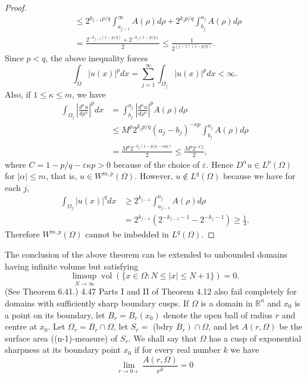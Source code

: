 \begin{proof}
\[\begin{aligned}
  & \leq 2^{k_{j-1} p / q} \int_{a_{j-1}}^{\infty} A(\rho) d \rho+2^{k_j p / q} \int_{b_j}^{a_j} A(\rho) d \rho \\
  & =\frac{2^{-k_{j-1}(1-p / q)}+2^{-k_j(1-p / q)}}{2} \leq \frac{1}{2^{(j-1)(1-p / q)}} .
  \end{aligned}
  \]
  Since $p<q$, the above inequality forces
  \[
  \int_{\Omega}|u(x)|^p d x=\sum_{j=1}^{\infty} \int_{\Omega_j}|u(x)|^p d x<\infty .
  \]
  Also, if $1 \leq \kappa \leq m$, we have
  \[
  \begin{aligned}
  \int_{\Omega_j}\left|\frac{d^\kappa u}{d \rho^\kappa}\right|^p d x & =\int_{b_j}^{a_j}\left|\frac{d^\kappa u}{d \rho^\kappa}\right|^p A(\rho) d \rho \\
  & \leq M^p 2^{k_j p / q}\left(a_j-b_j\right)^{-\kappa p} \int_{b_j}^{a_j} A(\rho) d \rho \\
  & =\frac{M^p 2^{-k_j(1-p / q-\varepsilon \kappa p)}}{2} \leq \frac{M^p 2^{-C j}}{2},
  \end{aligned}
  \]
  where $C=1-p / q-\varepsilon \kappa p>0$ because of the choice of $\varepsilon$. Hence $D^\alpha u \in L^p(\Omega)$ for $|\alpha| \leq m$, that is, $u \in W^{m, p}(\Omega)$. However, $u \notin L^q(\Omega)$ because we have for each $j$,
  \[
  \begin{aligned}
  \int_{\Omega_j}|u(x)|^q d x & \geq 2^{k_{j-1}} \int_{a_{j-1}}^{a_j} A(\rho) d \rho \\
  & =2^{k_{j-1}}\left(2^{-k_{j-1}-1}-2^{-k_j-1}\right) \geq \frac{1}{4} .
  \end{aligned}
  \]
  Therefore $W^{m, p}(\Omega)$ cannot be imbedded in $L^q(\Omega)$.
\end{proof}

The conclusion of the above theorem can be extended to unbounded domains having infinite volume but satisfying
\[
\limsup _{N \rightarrow \infty} \operatorname{vol}(\{x \in \Omega: N \leq|x| \leq N+1\})=0 .
\]
(See Theorem 6.41.)
4.47 Parts I and II of Theorem 4.12 also fail completely for domains with sufficiently sharp boundary cusps. If $\Omega$ is a domain in $\mathbb{R}^n$ and $x_0$ is a point on its boundary, let $B_r=B_r\left(x_0\right)$ denote the open ball of radius $r$ and centre at $x_0$. Let $\Omega_r=B_r \cap \Omega$, let $S_r=$ (bdry $\left.B_r\right) \cap \Omega$, and let $A(r, \Omega)$ be the surface area ((n-1)-measure) of $S_r$. We shall say that $\Omega$ has a cusp of exponential sharpness
at its boundary point $x_0$ if for every real number $k$ we have
\[
\lim _{r \rightarrow 0+} \frac{A(r, \Omega)}{r^k}=0
\]


